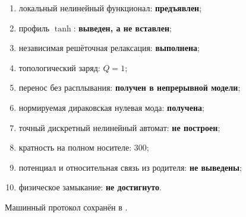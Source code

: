 \begin{protocol}
\begin{enumerate}
 \item локальный нелинейный функционал: \textbf{предъявлен};
 \item профиль $\tanh$: \textbf{выведен, а не вставлен};
 \item независимая решёточная релаксация: \textbf{выполнена};
 \item топологический заряд: \textbf{$Q=1$};
 \item перенос без расплывания: \textbf{получен в непрерывной модели};
 \item нормируемая дираковская нулевая мода: \textbf{получена};
 \item точный дискретный нелинейный автомат: \textbf{не построен};
 \item кратность на полном носителе: \textbf{$300$};
 \item потенциал и относительная связь из родителя: \textbf{не выведены};
 \item физическое замыкание: \textbf{не достигнуто}.
\end{enumerate}
\end{protocol}

Машинный протокол сохранён в
.